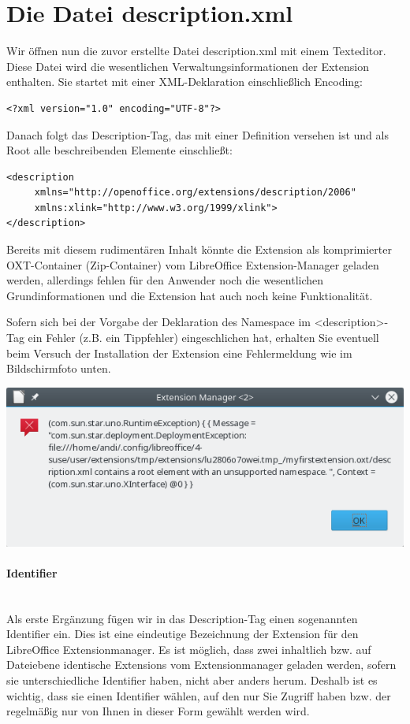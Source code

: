 \documentclass[a4paper,10pt,pagesize,titlepage]{scrbook}
\begin{document}
\section{Die Datei description.xml}
Wir öffnen nun die zuvor erstellte Datei description.xml mit einem Texteditor. Diese Datei wird die wesentlichen Verwaltungsinformationen der Extension enthalten.
Sie startet mit einer XML-Deklaration einschließlich Encoding:
\begin{lstlisting}
<?xml version="1.0" encoding="UTF-8"?>
\end{lstlisting}
Danach folgt das Description-Tag, das mit einer Definition versehen ist und als Root alle beschreibenden Elemente einschließt:
\begin{lstlisting}
<description
     xmlns="http://openoffice.org/extensions/description/2006"
     xmlns:xlink="http://www.w3.org/1999/xlink">
</description>
\end{lstlisting}
Bereits mit diesem rudimentären Inhalt könnte die Extension als komprimierter OXT-Container (Zip-Container) vom LibreOffice Extension-Manager geladen werden, allerdings fehlen für den Anwender noch die wesentlichen Grundinformationen und die Extension hat auch noch keine Funktionalität.

Sofern sich bei der Vorgabe der Deklaration des Namespace im <description>-Tag ein Fehler (z.B. ein Tippfehler) eingeschlichen hat, erhalten Sie eventuell beim Versuch der Installation der Extension eine Fehlermeldung wie im Bildschirmfoto unten.
\begin{center}
\includegraphics[width=0.7\linewidth]{pics/error_wrong_namedeclaration}
\label{fig:error_wrong_namedeclaration}
\end{center}


\paragraph*{Identifier}$~~$\\

Als erste Ergänzung fügen wir in das Description-Tag einen sogenannten Identifier ein. Dies ist eine eindeutige Bezeichnung der Extension für den LibreOffice Extensionmanager. Es ist möglich, dass zwei inhaltlich bzw. auf Dateiebene identische Extensions vom Extensionmanager geladen werden, sofern sie unterschiedliche Identifier haben, nicht aber anders herum. Deshalb ist es wichtig, dass sie einen Identifier wählen, auf den nur Sie Zugriff haben bzw. der regelmäßig nur von Ihnen in dieser Form gewählt werden wird.
\end{document}
